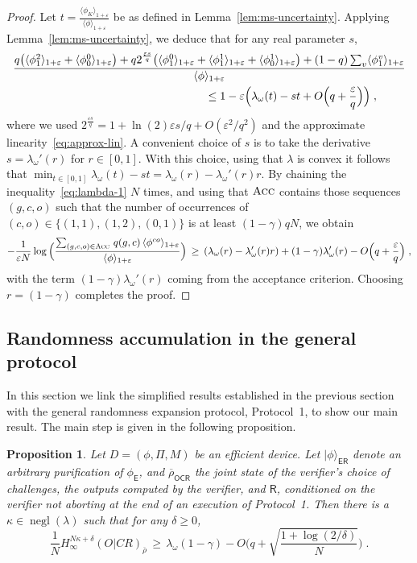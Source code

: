 \documentclass[11pt]{article}
\newtheorem{proposition}[theorem]{Proposition}
\theoremstyle{remark}
\theoremstyle{definition}
\newcommand{\ket}[1]{|#1\rangle}
\newcommand{\reg}[1]{{\textsf{#1}}}
\newcommand{\ol}[1]{\overline{#1}}
\DeclareMathOperator{\negl}{negl}
\newcommand{\eps}{\varepsilon}
\newcommand{\Acc}{\textsc{Acc}}
\newcommand{\Hmin}{H_\infty}
\begin{document}
\begin{proof}
Let $t = \frac{\langle \phi_K \rangle_{1+\eps} }{\langle \phi \rangle_{1+\eps}}$ be as defined in Lemma~\ref{lem:ms-uncertainty}. Applying Lemma~\ref{lem:ms-uncertainty}, we deduce that for any real parameter  $s$,
\begin{align}
 &\frac{   q\big(\langle \phi_1^2 \rangle_{1+\eps}+\langle \phi_0^0 \rangle_{1+\eps}\big)  + q2^{\frac{\eps s}{q}}\big( \langle \phi_1^0 \rangle_{1+\eps} + \langle \phi_1^1 \rangle_{1+\eps} + \langle \phi_0^1 \rangle_{1+\eps}\big)+(1-q)\sum_v \langle \phi_1^v \rangle_{1+\eps}}{\langle \phi \rangle_{1+\eps} }\notag \\
&\hskip6cm \leq 1 - \eps\Big( \lambda_\omega(t) -st +O\Big(q+\frac{\eps}{q}\Big)\Big)\;,\label{eq:lambda-1}
\end{align}
where we used $2^{\frac{\eps s}{q}} = 1+\ln(2)\eps s/q + O(\eps^2/q^2)$ and the approximate linearity~\eqref{eq:approx-lin}. 
A convenient choice of $s$ is to take the derivative $s=\lambda_\omega'(r)$ for $r\in[0,1]$. With this choice, using that $\lambda$ is convex it follows that $\min_{t\in[0,1]} \lambda_\omega(t)-st = \lambda_\omega(r)-\lambda_\omega'(r)r$.
By chaining the inequality~\eqref{eq:lambda-1} $N$ times, and using that $\Acc$ contains those sequences $(g,c,o)$ such that the number of occurrences of $(c,o)\in\{(1,1),(1,2),(0,1)\}$ is at least $(1-\gamma)qN$, we obtain
$$ - \frac{1}{\eps N} \log \Big( \frac{ \sum_{(g,c,o) \in \Acc} \,q(g,c) \,\langle \phi^{co} \rangle_{1+\eps}}{\langle \phi \rangle_{1+\eps} }\Big) \,\geq\, (\lambda_\omega(r)-\lambda_\omega'(r)r) + (1-\gamma)\lambda_\omega'(r) -O\Big(q+\frac{\eps}{q}\Big)\;,$$
with  the term $(1-\gamma)\lambda_\omega'(r)$ coming from the acceptance criterion. Choosing $r=(1-\gamma)$ completes the proof. 
\end{proof}

\subsection{Randomness accumulation in the general protocol}
\label{sec:randomness}

In this section we link the simplified results established in the previous section with the general randomness expansion protocol, Protocol~1, to show our main result. 
The main step is given in the following proposition. 

\begin{proposition}\label{prop:randomness}
Let $D=(\phi,\Pi,M)$ be an efficient device.
Let $\ket{\phi}_{\reg{ER}}$ denote an arbitrary purification of $\phi_\reg{E}$, and $\ol{\rho}_{\reg{OCR}}$ the joint state of the verifier's choice of challenges, the outputs computed by the verifier, and $\reg{R}$, conditioned on the verifier not aborting at the end of an execution of Protocol~1. 
 Then there is a $\kappa\in\negl(\lambda)$ such that for any $\delta \geq 0$,  
\begin{equation}\label{eq:ent-bound-1}
\frac{1}{N}\Hmin^{N\kappa+\delta}(O|CR)_{\ol{\rho}} \,\geq\, \lambda_\omega(1-\gamma) - O\Big(q+\sqrt{\frac{1+\log(2/\delta)}{N}}\Big)\;.
\end{equation}
\end{proposition}
\end{document}
